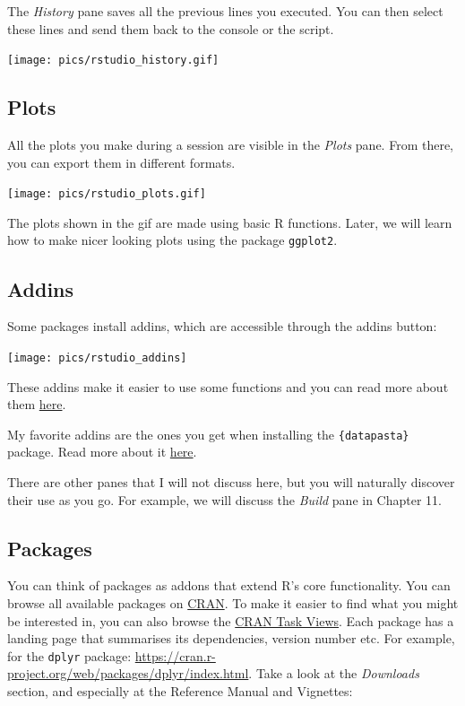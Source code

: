 \documentclass[
]{article}
\begin{document}
The \emph{History} pane saves all the previous lines you executed. You can then select these lines and
send them back to the console or the script.

\texttt{[image: pics/rstudio\_history.gif]}

\hypertarget{plots}{%
\subsection{Plots}\label{plots}}

All the plots you make during a session are visible in the \emph{Plots} pane. From there, you can
export them in different formats.

\texttt{[image: pics/rstudio\_plots.gif]}

The plots shown in the gif are made using basic R functions. Later, we will learn how to make nicer
looking plots using the package \texttt{ggplot2}.

\hypertarget{addins}{%
\subsection{Addins}\label{addins}}

Some packages install addins, which are accessible through the addins button:

\texttt{[image: pics/rstudio\_addins]}

These addins make it easier to use some functions and you can read more about them \href{https://rstudio.github.io/rstudioaddins/\#overview}{here}.

My favorite addins are the ones you get when installing the \texttt{\{datapasta\}} package. Read more about
it \href{https://github.com/MilesMcBain/datapasta}{here}.

There are other panes that I will not discuss here, but you will naturally discover their use as you
go. For example, we will discuss the \emph{Build} pane in Chapter 11.

\hypertarget{packages}{%
\subsection{Packages}\label{packages}}

You can think of packages as addons that extend R's core functionality. You can browse all available
packages on \href{https://cloud.r-project.org/}{CRAN}. To make it easier to find what you might be
interested in, you can also browse the \href{https://cloud.r-project.org/web/views/}{CRAN Task Views}.
Each package has a landing page that summarises its dependencies, version number etc. For example,
for the \texttt{dplyr} package: \url{https://cran.r-project.org/web/packages/dplyr/index.html}.
Take a look at the \emph{Downloads} section, and especially at the Reference Manual and Vignettes:
\end{document}
